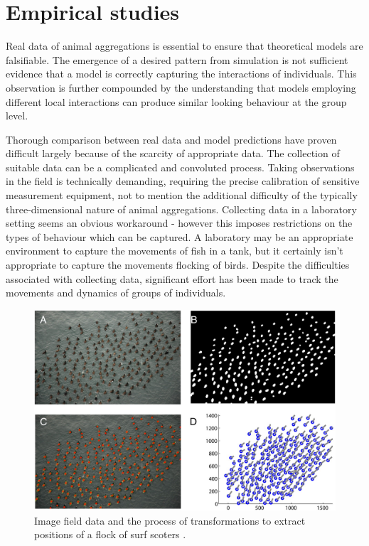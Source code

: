 \section{Empirical studies}
\label{sec:empirical_studies}

Real data of animal aggregations is essential to ensure that theoretical models are falsifiable. The emergence of a desired pattern from simulation is not sufficient evidence that a model is correctly capturing the interactions of individuals. This observation is further compounded by the understanding that models employing different local interactions can produce similar looking behaviour at the group level.

Thorough comparison between real data and model predictions have proven difficult largely because of the scarcity of appropriate data. The collection of suitable data can be a complicated and convoluted process. Taking observations in the field is technically demanding, requiring the precise calibration of sensitive measurement equipment, not to mention the additional difficulty of the typically three-dimensional nature of animal aggregations. Collecting data in a laboratory setting seems an obvious workaround - however this imposes restrictions on the types of behaviour which can be captured. A laboratory may be an appropriate environment to capture the movements of fish in a tank, but it certainly isn't appropriate to capture the movements flocking of birds. Despite the difficulties associated with collecting data, significant effort has been made to track the movements and dynamics of groups of individuals.

\begin{figure}
	\includegraphics[width=\textwidth]{fig/lukeman_data.jpg}
	\caption{Image field data and the process of transformations to extract positions of a flock of surf scoters \citep{lukeman10}.}
	\label{fig:lukeman_data}
\end{figure}

